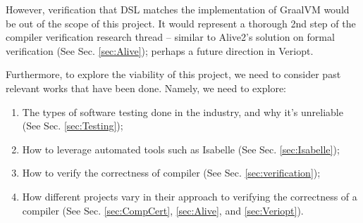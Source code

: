 However, verification that DSL matches the implementation of GraalVM would be out of the scope of this project. It would represent a thorough 
2nd step of the compiler verification research thread \cite[pp. 5]{CompilerOptimization} -- similar to Alive2's \cite{Alive2} solution on formal 
verification (See Sec. \ref{sec:Alive}); perhaps a future direction in Veriopt.

Furthermore, to explore the viability of this project, we need to consider past relevant works that have been done. Namely, we need to explore:

\begin{enumerate}
    \item The types of software testing done in the industry, and why it's unreliable (See Sec. \ref{sec:Testing});
    \item How to leverage automated tools such as Isabelle (See Sec. \ref{sec:Isabelle});
    \item How to verify the correctness of compiler (See Sec. \ref{sec:verification});
    \item How different projects vary in their approach to verifying the correctness of a compiler (See Sec. \ref{sec:CompCert}, 
          \ref{sec:Alive}, and \ref{sec:Veriopt}).
\end{enumerate}